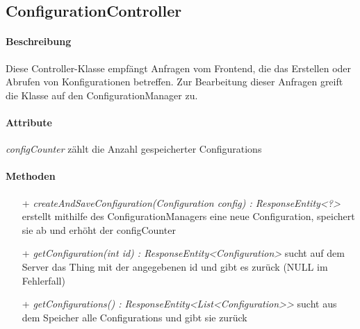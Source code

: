 \subsection{ConfigurationController}

\paragraph{Beschreibung}
Diese Controller-Klasse empfängt Anfragen vom Frontend, die das Erstellen oder Abrufen von Konfigurationen betreffen. Zur Bearbeitung dieser Anfragen greift die Klasse auf den ConfigurationManager zu.


\paragraph{Attribute}
\item[-] \textit{configCounter} zählt die Anzahl gespeicherter Configurations

\paragraph{Methoden}
\begin{itemize}
\item[+] \textit{ createAndSaveConfiguration(Configuration config) : ResponseEntity<?> }
erstellt mithilfe des ConfigurationManagers eine neue Configuration, speichert sie ab und erhöht der configCounter
\item[+] \textit{getConfiguration(int id) : ResponseEntity<Configuration>}
sucht auf dem Server das Thing mit der angegebenen id und gibt es zurück (NULL im Fehlerfall)
\item[+] \textit{getConfigurations() : ResponseEntity<List<Configuration>> }
sucht aus dem Speicher alle Configurations und gibt sie zurück
\end{itemize}